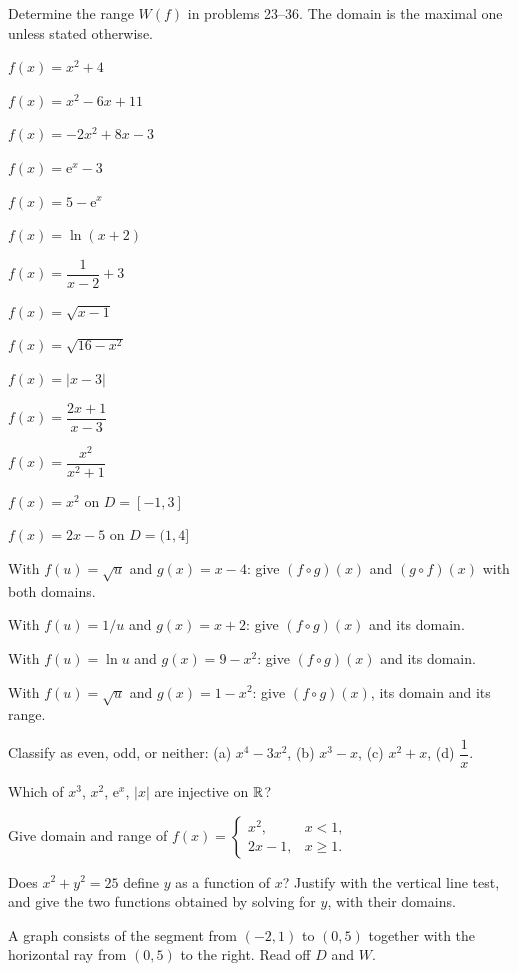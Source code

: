Determine the range $W(f)$ in problems 23--36. The domain is the maximal
one unless stated otherwise.

\begin{problems}[resume]
  \item $f(x)=x^{2}+4$
  \item $f(x)=x^{2}-6x+11$
  \item $f(x)=-2x^{2}+8x-3$
  \item $f(x)=\mathrm{e}^{x}-3$
  \item $f(x)=5-\mathrm{e}^{x}$
  \item $f(x)=\ln(x+2)$
  \item $f(x)=\dfrac{1}{x-2}+3$
  \item $f(x)=\sqrt{x-1}$
  \item $f(x)=\sqrt{16-x^{2}}$
  \item $f(x)=|x-3|$
  \item $f(x)=\dfrac{2x+1}{x-3}$
  \item $f(x)=\dfrac{x^{2}}{x^{2}+1}$
  \item $f(x)=x^{2}$ on $D=[-1,3]$
  \item $f(x)=2x-5$ on $D=(1,4]$
\end{problems}

\begin{problems}[resume]
  \item With $f(u)=\sqrt{u}$ and $g(x)=x-4$: give $(f\circ g)(x)$ and
        $(g\circ f)(x)$ with both domains.
  \item With $f(u)=1/u$ and $g(x)=x+2$: give $(f\circ g)(x)$ and its
        domain.
  \item With $f(u)=\ln u$ and $g(x)=9-x^{2}$: give $(f\circ g)(x)$ and its
        domain.
  \item With $f(u)=\sqrt{u}$ and $g(x)=1-x^{2}$: give $(f\circ g)(x)$, its
        domain and its range.
  \item Classify as even, odd, or neither:
        (a) $x^{4}-3x^{2}$, \;(b) $x^{3}-x$, \;(c) $x^{2}+x$,
        \;(d) $\dfrac{1}{x}$.
  \item Which of $x^{3}$, $x^{2}$, $\mathrm{e}^{x}$, $|x|$ are injective on
        $\mathbb{R}$?
  \item Give domain and range of
        $f(x)=\begin{cases} x^{2}, & x<1,\\ 2x-1, & x\geq 1.\end{cases}$
  \item Does $x^{2}+y^{2}=25$ define $y$ as a function of $x$? Justify with
        the vertical line test, and give the two functions obtained by
        solving for $y$, with their domains.
  \item A graph consists of the segment from $(-2,1)$ to $(0,5)$ together
        with the horizontal ray from $(0,5)$ to the right. Read off
        $D$ and $W$.
\end{problems}

